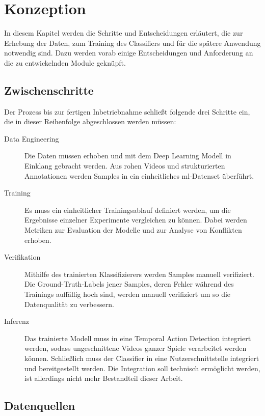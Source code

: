 \chapter{Konzeption}
\label{ch:concept}

In diesem Kapitel werden die Schritte und Entscheidungen erläutert, die zur Erhebung der Daten, zum Training des Classifiers und für die spätere Anwendung notwendig sind.
Dazu werden vorab einige Entscheidungen und Anforderung an die zu entwickelnden Module geknüpft.

\section{Zwischenschritte}
\label{sec:steps}

Der Prozess bis zur fertigen Inbetriebnahme schließt folgende drei Schritte ein, die in dieser Reihenfolge abgeschlossen werden müssen:

\begin{description}
    \item[Data Engineering] Die Daten müssen erhoben und mit dem Deep Learning Modell in Einklang gebracht werden.
    Aus rohen Videos und strukturierten Annotationen werden Samples in ein einheitliches \gls{ml}-Datenset überführt.
    \item[Training] Es muss ein einheitlicher Trainingsablauf definiert werden, um die Ergebnisse einzelner Experimente vergleichen zu können.
    Dabei werden Metriken zur Evaluation der Modelle und zur Analyse von Konflikten erhoben.
    \item[Verifikation] Mithilfe des trainierten Klassifizierers werden Samples manuell verifiziert.
    Die Ground-Truth-Labels jener Samples, deren Fehler während des Trainings auffällig hoch sind, werden manuell verifiziert um so die Datenqualität zu verbessern.
    \item[Inferenz] Das trainierte Modell muss in eine Temporal Action Detection integriert werden, sodass ungeschnittene Videos ganzer Spiele verarbeitet werden können.
    Schließlich muss der Classifier in eine Nutzerschnittstelle integriert und bereitgestellt werden.
    Die Integration soll technisch ermöglicht werden, ist allerdings nicht mehr Bestandteil dieser Arbeit.
\end{description}

\section{Datenquellen}
\label{sec:datenquellen}

